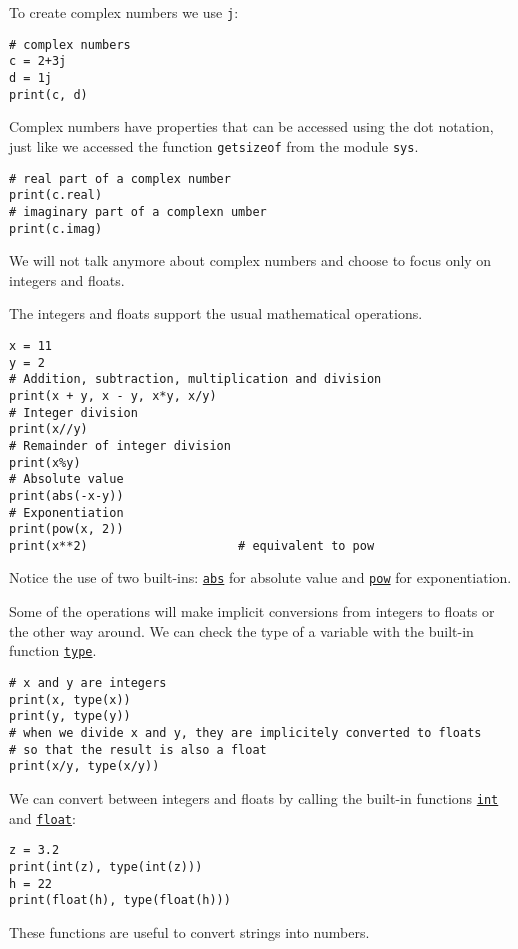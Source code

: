 \documentclass[12pt, a4paper]{article}
\begin{document}
To create complex numbers we use \texttt{j}:
\lstset{language=jupyter-python,label= ,caption= ,captionpos=b,numbers=none}
\begin{lstlisting}
# complex numbers
c = 2+3j
d = 1j
print(c, d)
\end{lstlisting}
Complex numbers have properties that can be accessed using the dot notation, just like we accessed the function \texttt{getsizeof} from the module \texttt{sys}.
\lstset{language=jupyter-python,label= ,caption= ,captionpos=b,numbers=none}
\begin{lstlisting}
# real part of a complex number
print(c.real)
# imaginary part of a complexn umber
print(c.imag)
\end{lstlisting}
We will not talk anymore about complex numbers and choose to focus only on integers and floats.

The integers and floats support the usual mathematical operations.
\lstset{language=jupyter-python,label= ,caption= ,captionpos=b,numbers=none}
\begin{lstlisting}
x = 11
y = 2
# Addition, subtraction, multiplication and division
print(x + y, x - y, x*y, x/y)
# Integer division
print(x//y)
# Remainder of integer division
print(x%y)
# Absolute value
print(abs(-x-y))
# Exponentiation
print(pow(x, 2))
print(x**2)                     # equivalent to pow
\end{lstlisting}
Notice the use of two built-ins: \href{https://docs.python.org/3.6/library/functions.html?abs\#abs}{\texttt{abs}} for absolute value and \href{https://docs.python.org/3.6/library/functions.html?abs\#pow}{\texttt{pow}} for exponentiation.

Some of the operations will make implicit conversions from integers to floats or the other way around.
We can check the type of a variable with the built-in function \href{https://docs.python.org/3.6/library/functions.html?\#type}{\texttt{type}}.
\lstset{language=jupyter-python,label= ,caption= ,captionpos=b,numbers=none}
\begin{lstlisting}
# x and y are integers
print(x, type(x))
print(y, type(y))
# when we divide x and y, they are implicitely converted to floats
# so that the result is also a float
print(x/y, type(x/y))
\end{lstlisting}

We can convert between integers and floats by calling the built-in functions \href{https://docs.python.org/3.6/library/functions.html?\#int}{\texttt{int}} and \href{https://docs.python.org/3.6/library/functions.html?\#float}{\texttt{float}}:
\lstset{language=jupyter-python,label= ,caption= ,captionpos=b,numbers=none}
\begin{lstlisting}
z = 3.2
print(int(z), type(int(z)))
h = 22
print(float(h), type(float(h)))
\end{lstlisting}
These functions are useful to convert strings into numbers.
\end{document}
